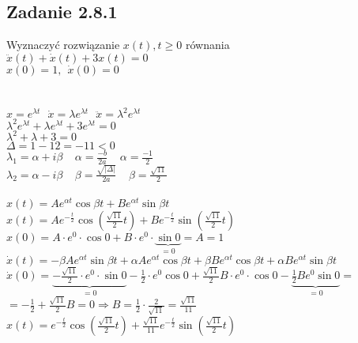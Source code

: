\pagebreak
\subsection*{Zadanie 2.8.1} {\color{darkgray}
	Wyznaczyć rozwiązanie $x(t), t\geqslant 0$ równania\\
	$\ddot{x}(t)+\dot{x}(t)+3x(t)=0$\\
	$x(0)=1, \ \ \dot{x}(0)=0$\\
}\lineh
\\\\
$x=e^{\lambda t} \ \ \ \dot{x}=\lambda e^{\lambda t} \ \ \ \ddot{x}=\lambda^2 e^{\lambda t}$\\
$\lambda^2e^{\lambda t}+\lambda e^{\lambda t}+3e^{\lambda t}=0$\\
$\lambda^2+\lambda+3=0$\\
$\Delta=1-12=-11<0$\\
$\lambda_1=\alpha+i\beta \ \ \ \ \ \alpha=\frac{-b}{2a} \ \ \ \ \ \alpha=\frac{-1}{2}$\\
$\lambda_2=\alpha-i\beta \ \ \ \ \ \beta=\frac{\sqrt{|\Delta|}}{2a} \ \ \ \ \ \beta=\frac{\sqrt{11}}{2}$\\
\\
$x(t)=Ae^{\alpha t}\cos \beta t+Be^{\alpha t}\sin \beta t$\\
$x(t)=Ae^{-\frac{t}{2}}\cos(\frac{\sqrt{11}}{2}t)+Be^{-\frac t2}\sin(\frac{\sqrt{11}}{2}t)$\\
$x(0)=A\cdot e^0\cdot \cos 0+B\cdot e^0 \cdot  \underbrace{\sin 0}_{=0}=\boxed{A=1}$\\
$\dot{x}(t)=-\beta Ae^{\alpha t}\sin \beta t+\alpha A e^{\alpha t}\cos \beta t+\beta Be^{\alpha t}\cos\beta t+\alpha B e^{\alpha t}\sin \beta t$\\
$\dot{x}(0)=\underbrace{-\frac{\sqrt{11}}{2}\cdot e^0\cdot\sin 0}_{=0}-\frac12\cdot e^0\cos 0+\frac{\sqrt{11}}{2}B\cdot e^0\cdot\cos 0 -\underbrace{\frac12Be^0\sin0}_{=0}=$\\
$=-\frac12+\frac{\sqrt{11}}{2}B=0\Rightarrow\boxed{B=\frac12\cdot\frac{2}{\sqrt{11}}=\frac{\sqrt{11}}{11}}$\\
$\boxed{x(t)=e^{-\frac t2}\cos(\frac{\sqrt{11}}{2}t)+\frac{\sqrt{11}}{11}e^{-\frac t2}\sin(\frac{\sqrt{11}}{2}t)}$\\


\pagebreak
